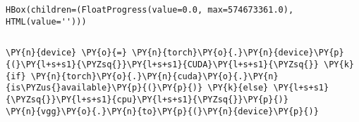     
    \begin{verbatim}
HBox(children=(FloatProgress(value=0.0, max=574673361.0), HTML(value='')))
    \end{verbatim}

    
    \begin{Verbatim}[commandchars=\\\{\}]

    \end{Verbatim}

    \begin{tcolorbox}[breakable, size=fbox, boxrule=1pt, pad at break*=1mm,colback=cellbackground, colframe=cellborder]
\begin{Verbatim}[commandchars=\\\{\}]
\PY{n}{device} \PY{o}{=} \PY{n}{torch}\PY{o}{.}\PY{n}{device}\PY{p}{(}\PY{l+s+s1}{\PYZsq{}}\PY{l+s+s1}{CUDA}\PY{l+s+s1}{\PYZsq{}} \PY{k}{if} \PY{n}{torch}\PY{o}{.}\PY{n}{cuda}\PY{o}{.}\PY{n}{is\PYZus{}available}\PY{p}{(}\PY{p}{)} \PY{k}{else} \PY{l+s+s1}{\PYZsq{}}\PY{l+s+s1}{cpu}\PY{l+s+s1}{\PYZsq{}}\PY{p}{)}
\PY{n}{vgg}\PY{o}{.}\PY{n}{to}\PY{p}{(}\PY{n}{device}\PY{p}{)}
\end{Verbatim}
\end{tcolorbox}

